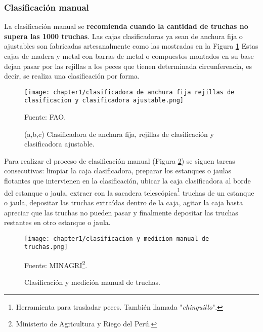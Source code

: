 \subsubsection{Clasificación manual}

La clasificación manual se \textbf{recomienda cuando la cantidad de truchas no supera las 1000 truchas}.\cite[p.~25]{FAO2014} Las cajas clasificadoras ya sean de anchura fija o ajustables son fabricadas artesanalmente como las mostradas en la Figura \ref{fig:clasificadora de anchura fija rejillas de clasificacion y clasificadora ajustable} Estas cajas de madera y metal con barras de metal o compuestos montados en su base dejan pasar por las rejillas a los peces que tienen determinada circunferencia, es decir, se realiza una clasificación por forma.\cite[p.~15]{FAO2005}

\begin{figure}[H]
	\centering
	\texttt{[image: chapter1/clasificadora de anchura fija rejillas de clasificacion y clasificadora ajustable.png]}
	\caption{(a,b,c) Clasificadora de anchura fija, rejillas de clasificación y clasificadora ajustable.}
	Fuente: FAO.
	\label{fig:clasificadora de anchura fija rejillas de clasificacion y clasificadora ajustable}
\end{figure}

Para realizar el proceso de clasificación manual (Figura \ref{fig:clasificacion y medicion manual de truchas}) se siguen tareas consecutivas: limpiar la caja clasificadora, preparar los estanques o jaulas flotantes que intervienen en la clasificación, ubicar la caja clasificadora al borde del estanque o jaula, extraer con la sacadera telescópica\footnote{Herramienta para trasladar peces. También llamada "\textit{chinguillo}".} truchas de un estanque o jaula, depositar las truchas extraídas dentro de la caja, agitar la caja hasta apreciar que las truchas no pueden pasar y finalmente depositar las truchas restantes en otro estanque o jaula.\\

\begin{savenotes}
	\begin{figure}[H]
		\centering
		\texttt{[image: chapter1/clasificacion y medicion manual de truchas.png]}
		\caption{Clasificación y medición manual de truchas.}
		Fuente: MINAGRI\footnote{Ministerio de Agricultura y Riego del Perú.}.
		\label{fig:clasificacion y medicion manual de truchas}
	\end{figure}
\end{savenotes}

